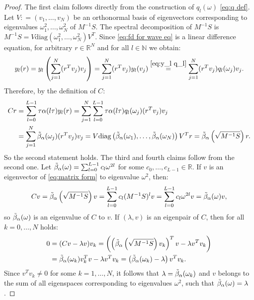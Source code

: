 \documentclass[a4paper,11pt,bibliography=totoc,listof=totoc,headinclude=true,cleardoublepage=empty,oneside]{scrbook}
\newcommand{\R}{\mathbb{R}}
\newcommand{\N}{\mathbb{N}}
\newcommand{\dff}{\Tilde{\beta}_\alpha}
\begin{document}
\begin{proof}
    The first claim follows directly from the construction of $q_l(\omega)$ \eqref{eq:q def}. Let $V: = (v_1, \dots, v_N)$ be an orthonormal basis of eigenvectors corresponding to eigenvalues $\omega_1^2, \dots, \omega_N^2$ of $M^{-1}S$. The spectral decomposition of $M^{-1}S$ is $M^{-1}S = V \mathrm{diag}(\omega_1^2, \dots, \omega_N^2) V^T$. Since \eqref{eq:fd for wave eq} is a linear difference equation, for arbitrary $r\in\R^N$ and for all $l\in \N$ we obtain:
    \begin{equation*}
        y_l(r) = y_l \left( \sum_{j=1}^N (r^T v_j)v_j \right) = \sum_{j=1}^N (r^T v_j)y_l(v_j) \stackrel{\eqref{eq:y_l q_l}}{=} \sum_{j=1}^N (r^T v_j)q_l(\omega_j)v_j.
    \end{equation*}
    Therefore, by the definition of $C$:
    \begin{align*}
        Cr &= \sum_{l=0}^{L-1} \tau\alpha(l\tau) y_l(r) = \sum_{j=1}^N \sum_{l=0}^{L-1} \tau\alpha(l\tau)q_l(\omega_j) (r^T v_j) v_j \\ &= \sum_{j=1}^{N}\dff(\omega_j)(r^Tv_j)v_j = V \mathrm{diag}\left(\dff(\omega_1), \dots, \dff(\omega_N)\right)V^Tr = \dff\left(\sqrt{M^{-1} S}\right)r.
    \end{align*}
    So the second statement holds. The third and fourth claims follow from the second one. Let $\dff(\omega) = \sum_{l=0}^{L-1} c_l \omega^{2l}$ for some $c_0, \dots, c_{L-1}\in \R$. If $v$ is an eigenvector of \eqref{eq:matrix form} to eigenvalue $\omega^2$, then:
    \begin{equation*}
        Cv = \dff\left(\sqrt{M^{-1}S}\right)v = \sum_{l=0}^{L-1} c_l (M^{-1}S)^{l}v = \sum_{l=0}^{L-1} c_l \omega^{2l}v = \dff(\omega)v,
    \end{equation*}
    so $\dff(\omega)$ is an eigenvalue of $C$ to $v$. If $(\lambda, v)$ is an eigenpair of $C$, then for all $k=0,\dots, N$ holds:
    \begin{align*}
        0 &= (Cv - \lambda v)v_k = \left(\left(\dff\left(\sqrt{M^{-1}S}\right)v_k\right)^Tv - \lambda v^T v_k\right) \\&= \dff(\omega_k)v_k^T v - \lambda v^T v_k = \left(\dff(\omega_k) - \lambda\right)v^T v_k.
    \end{align*}
    Since $v^Tv_k \neq 0$ for some $k=1, \dots, N$, it follows that $\lambda = \dff(\omega_k)$ and $v$ belongs to the sum of all eigenspaces corresponding to eigenvalues $\omega^2$, such that $\dff(\omega) = \lambda$.
\end{proof}
\end{document}
